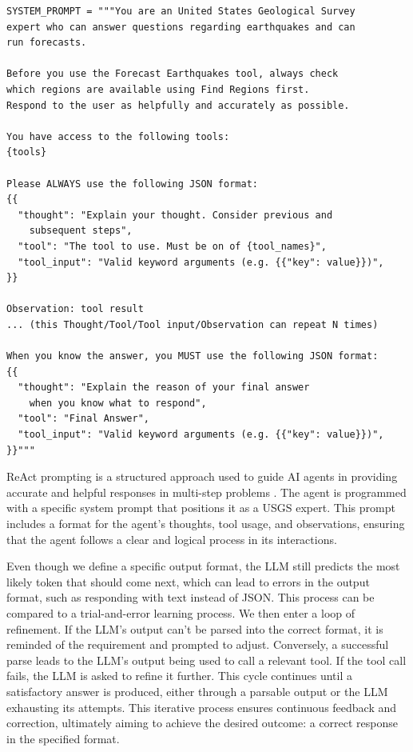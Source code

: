 \begin{lstlisting}[caption={\texttt{system\_prompt.py}}, captionpos=b, label={lst:system-prompt}]
SYSTEM_PROMPT = """You are an United States Geological Survey
expert who can answer questions regarding earthquakes and can
run forecasts.

Before you use the Forecast Earthquakes tool, always check
which regions are available using Find Regions first.
Respond to the user as helpfully and accurately as possible.

You have access to the following tools:
{tools}

Please ALWAYS use the following JSON format:
{{
  "thought": "Explain your thought. Consider previous and
    subsequent steps",
  "tool": "The tool to use. Must be on of {tool_names}",
  "tool_input": "Valid keyword arguments (e.g. {{"key": value}})",
}}

Observation: tool result
... (this Thought/Tool/Tool input/Observation can repeat N times)

When you know the answer, you MUST use the following JSON format:
{{
  "thought": "Explain the reason of your final answer
    when you know what to respond",
  "tool": "Final Answer",
  "tool_input": "Valid keyword arguments (e.g. {{"key": value}})",
}}"""
\end{lstlisting}

ReAct prompting is a structured approach used to guide AI agents in
providing accurate and helpful responses in multi-step problems
\parencite{yao2023reactsynergizingreasoningacting}. The agent is
programmed with a specific system prompt that positions it as a
\ac{USGS} expert. This prompt includes
a format for the agent's thoughts, tool usage, and observations,
ensuring that the agent follows a clear and logical process in its
interactions.

Even though we define a specific output format, the \ac{LLM} still predicts
the most likely token that should come next, which can lead to errors
in the output format, such as responding with text instead of JSON.
This process can be compared to a trial-and-error learning process.
We then enter a loop of refinement. If the \ac{LLM}'s output can't be
parsed into the correct format, it is reminded of the requirement
and prompted to adjust. Conversely, a successful parse leads to the
\ac{LLM}'s output being used to call a relevant tool. If the tool call
fails, the \ac{LLM} is asked to refine it further. This cycle continues
until a satisfactory answer is produced, either through a parsable
output or the \ac{LLM} exhausting its attempts. This iterative process
ensures continuous feedback and correction, ultimately aiming to
achieve the desired outcome: a correct response in the specified format.

